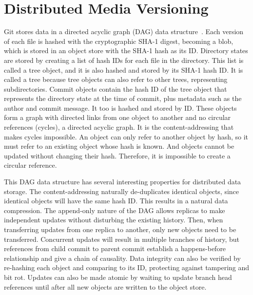 \section{Distributed Media Versioning}


Git stores data in a directed acyclic graph (DAG) data structure~\cite{git_initial_readme}.
Each version of each file is hashed with the cryptographic SHA-1 digest, becoming a \gls{blob}, which is stored in an object store with the SHA-1 hash as its ID.
Directory states are stored by creating a list of hash IDs for each file in the directory.
This list is called a tree object, and it is also hashed and stored by its SHA-1 hash ID.
It is called a tree because tree objects can also refer to other trees, representing subdirectories.
Commit objects contain the hash ID of the tree object that represents the directory state at the time of commit, plus metadata such as the author and commit message.
It too is hashed and stored by ID.
These objects form a graph with directed links from one object to another and no circular references (cycles), a directed acyclic graph.
It is the content-addressing that makes cycles impossible.
An object can only refer to another object by hash, so it must refer to an existing object whose hash is known.
And objects cannot be updated without changing their hash.
Therefore, it is impossible to create a circular reference.

This DAG data structure has several interesting properties for distributed data storage.
The content-addressing naturally de-duplicates identical objects, since identical objects will have the same hash ID.
This results in a natural data compression.
The append-only nature of the DAG allows replicas to make independent updates without disturbing the existing history.
Then, when transferring updates from one replica to another, only new objects need to be transferred.
Concurrent updates will result in multiple branches of history, but references from child commit to parent commit establish a happens-before relationship and give a chain of causality.
Data integrity can also be verified by re-hashing each object and comparing to its ID, protecting against tampering and bit rot.
Updates can also be made atomic by waiting to update branch head references until after all new objects are written to the object store.

